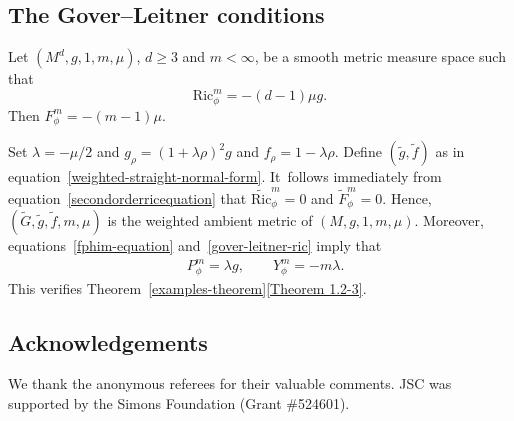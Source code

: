 \documentclass[10pt,a4paper]{amsart}
\numberwithin{equation}{section}
\begin{document}
\subsection{The Gover--Leitner conditions}

Let $(M^d,g,1,m,\mu)$, $d\geq 3$ and $m<\infty$, be a smooth metric measure space such that
\begin{equation}
\label{gover-leitner-ric}
\mathrm{Ric}_\phi^m=-(d-1)\mu g.
\end{equation} Then $F_\phi^m=-(m-1)\mu$.

Set $\lambda=-\mu/2$ and $g_\rho=(1+\lambda\rho)^2 g$ and $f_\rho=1-\lambda\rho$. Define $(\widetilde{g},\widetilde{f})$ as in equation~\eqref{weighted-straight-normal-form}. It~follows immediately from equation~\eqref{secondorderricequation} that $\widetilde{\mathrm{Ric}}_\phi^m=0$ and $\widetilde{F}_\phi^m=0$. Hence, $(\widetilde{G},\widetilde{g},\widetilde{f},m,\mu)$ is the weighted ambient metric of $(M,g,1,m,\mu)$. Moreover, equations~\eqref{fphim-equation} and~\eqref{gover-leitner-ric} imply that
\begin{align*}
&P_\phi^m=\lambda g,\qquad
Y_\phi^m=-m\lambda.
\end{align*}
This verifies Theorem~\ref{examples-theorem}\ref{Theorem 1.2-3}.

\subsection*{Acknowledgements}

We thank the anonymous referees for their valuable comments. JSC was supported by the Simons Foundation (Grant \#524601).

\end{document}
